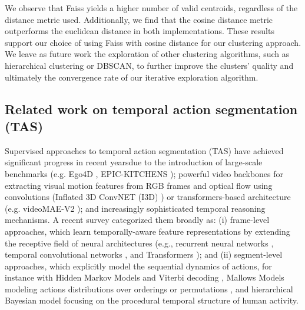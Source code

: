     We observe that Faiss yields a higher number of valid centroids, regardless of the distance metric used. Additionally, we find that the cosine distance metric outperforms the euclidean distance in both implementations. These results support our choice of using Faiss with cosine distance for our clustering approach. We leave as future work the exploration of other clustering algorithms, such as hierarchical clustering or DBSCAN, to further improve the clusters' quality and ultimately the convergence rate of our iterative exploration algorithm.


    \subsection{Related work on temporal action segmentation (TAS)}
    \label{apd:chapter_5_utas_related_work}

    

    Supervised approaches to temporal action segmentation (TAS) have achieved significant progress in recent years\footnotemark[1] due to the introduction of large-scale benchmarks (e.g. Ego4D \cite{ego4D}, EPIC-KITCHENS \cite{epic}); powerful video backbones for extracting visual motion features from RGB frames and optical flow using convolutions (Inflated 3D ConvNET (I3D) \cite{i3d}) or transformers-based architecture (e.g. videoMAE-V2 \cite{videomae-model}); and increasingly sophisticated temporal reasoning mechanisms. A recent survey \cite{TAS_survey} categorized them broadly as: (i) frame-level approaches, which learn temporally-aware feature representations by extending the receptive field of neural architectures (e.g., recurrent neural networks \cite{9156462}, temporal convolutional networks \cite{8099596, li2020ms}, and Transformers \cite{chinayi_ASformer, 10.5555/3295222.3295349}); and (ii) segment-level approaches, which explicitly model the sequential dynamics of actions, for instance with Hidden Markov Models and Viterbi decoding \cite{8578869, kukleva2019unsupervised, 6909500, 1054010}, Mallows Models modeling actions distributions over orderings or permutations \cite{sener2018unsupervised, MALLOWS1957}, and hierarchical Bayesian model \cite{goel2018learning} focusing on the procedural temporal structure of human activity. 

